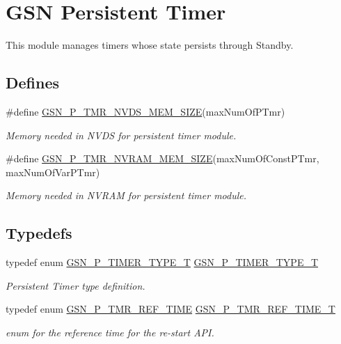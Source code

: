 \hypertarget{a00671}{
\section{GSN Persistent Timer}
\label{a00671}
}


This module manages timers whose state persists through Standby.  


\subsection*{Defines}
\begin{DoxyCompactItemize}
\item 
\#define \hyperlink{a00671_gaf983eb2e91bbb6a2e9a7d373419d69dd}{GSN\_\-P\_\-TMR\_\-NVDS\_\-MEM\_\-SIZE}(maxNumOfPTmr)
\begin{DoxyCompactList}\small\item\em Memory needed in NVDS for persistent timer module. \end{DoxyCompactList}\item 
\#define \hyperlink{a00671_ga814ac6b7dfd3d718d276b4794cb4b5d3}{GSN\_\-P\_\-TMR\_\-NVRAM\_\-MEM\_\-SIZE}(maxNumOfConstPTmr, maxNumOfVarPTmr)
\begin{DoxyCompactList}\small\item\em Memory needed in NVRAM for persistent timer module. \end{DoxyCompactList}\end{DoxyCompactItemize}
\subsection*{Typedefs}
\begin{DoxyCompactItemize}
\item 
typedef enum \hyperlink{a00671_gadc3540874fb3842b2eb56edd0c82945b}{GSN\_\-P\_\-TIMER\_\-TYPE\_\-T} \hyperlink{a00671_gad756dc4e5d1d8eb116b9daf7bddddb69}{GSN\_\-P\_\-TIMER\_\-TYPE\_\-T}
\begin{DoxyCompactList}\small\item\em Persistent Timer type definition. \end{DoxyCompactList}\item 
typedef enum \hyperlink{a00671_ga9aa5599a087c6080868052f86ecad7df}{GSN\_\-P\_\-TMR\_\-REF\_\-TIME} \hyperlink{a00671_ga8d27b193b47e23bf2bd68b439badf3d6}{GSN\_\-P\_\-TMR\_\-REF\_\-TIME\_\-T}
\begin{DoxyCompactList}\small\item\em enum for the reference time for the re-\/start API. \end{DoxyCompactList}\end{DoxyCompactItemize}

